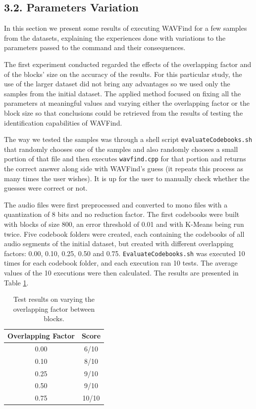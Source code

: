 \documentclass[12pt]{article}
\begin{document}
\subsection*{3.2. Parameters Variation}

In this section we present some results of executing WAVFind for a few samples
from the datasets, explaining the experiences done with variations to the 
parameters passed to the command and their consequences.

The first experiment conducted regarded the effects of the overlapping factor 
and of the blocks' size on the accuracy of the results.
For this particular study, the use of the larger dataset did not bring any 
advantages so we used only the samples from the initial dataset.
The applied method focused on fixing all the parameters at meaningful values and
varying either the overlapping factor or the block size so that conclusions 
could be retrieved from the results of testing the identification capabilities 
of WAVFind.

The way we tested the samples was through a shell script \texttt{evaluateCodebooks.sh}
that randomly chooses one of the samples and also randomly chooses a small portion
of that file and then executes \texttt{wavfind.cpp} for that portion and returns
the correct answer along side with WAVFind's guess (it repeats this process as 
many times the user wishes). 
It is up for the user to manually check whether the guesses were correct or not.

The audio files were first preprocessed and converted to mono files with a 
quantization of 8 bits and no reduction factor.
The first codebooks were built with blocks of size 800, an error threshold of 
0.01 and with K-Means being run twice.
Five codebook folders were created, each containing the codebooks of all audio
segments of the initial dataset, but created with different overlapping factors:
0.00, 0.10, 0.25, 0.50 and 0.75. 
\texttt{EvaluateCodebooks.sh} was executed 10 times for each codebook folder,
and each execution ran 10 tests.
The average values of the 10 executions were then calculated.
The results are presented in Table \ref{tab:overlapFactor}.

\begin{table}[H]
  \begin{center}
    \begin{tabular}{c|c}
      \textbf{Overlapping Factor} & \textbf{Score}\\
      \hline
      0.00 & 6/10\\
      0.10 & 8/10\\
      0.25 & 9/10\\
      0.50 & 9/10\\
      0.75 & 10/10\\
    \end{tabular}
  \end{center}
  \caption{Test results on varying the overlapping factor between blocks.}
  \label{tab:overlapFactor}
\end{table}
\end{document}
